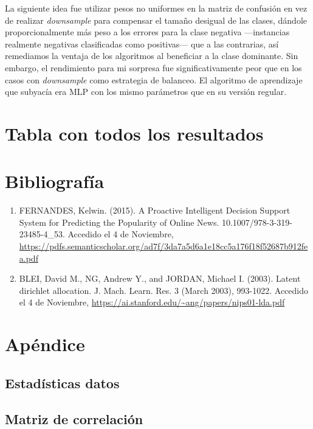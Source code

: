 \documentclass{article}
\newcommand{\img}[2]{
\noindent\makebox[\textwidth][c]{\texttt{[image: \#1]}}%
}
\begin{document}
\img{weigth1}{0.5}

La siguiente idea fue utilizar pesos no uniformes en la matriz de confusión en vez de realizar \textit{downsample} para compensar el tamaño desigual de las clases, dándole proporcionalmente más peso a los errores para la clase negativa ---instancias realmente negativas clasificadas como positivas--- que a las contrarias, así remediamos la ventaja de los algoritmos al beneficiar a la clase dominante. Sin embargo, el rendimiento para mi sorpresa fue significativamente peor que en los casos con \textit{downsample} como estrategia de balanceo. El algoritmo de aprendizaje que subyacía era MLP con los mismo parámetros que en su versión regular.

\img{weigth}{1.2}

\section{Tabla con todos los resultados}

\img{final}{1.2}

\newpage

\section{Bibliografía}
\begin{enumerate}
\item FERNANDES, Kelwin. (2015). A Proactive Intelligent Decision Support System for Predicting the Popularity of Online News. 10.1007/978-3-319-23485-4\_53. Accedido el 4 de Noviembre, \url{https://pdfs.semanticscholar.org/ad7f/3da7a5d6a1e18cc5a176f18f52687b912fea.pdf}

\item BLEI, David M., NG, Andrew Y., and JORDAN, Michael I. (2003). Latent dirichlet allocation. J. Mach. Learn. Res. 3 (March 2003), 993-1022. Accedido el 4 de Noviembre, \url{https://ai.stanford.edu/~ang/papers/nips01-lda.pdf}


\end{enumerate}


\section{Apéndice}
\subsection{Estadísticas datos}
\label{subsec:stats}
\img{stat}{1}

\img{stat2}{1}

\subsection{Matriz de correlación}
\label{subsec:corr}
\img{corr}{1}
\end{document}
